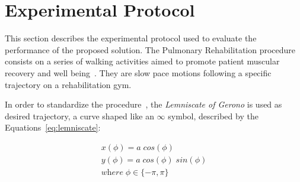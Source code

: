 \documentclass[journal]{IEEEtran}
\begin{document}




\section{Experimental Protocol} \label{experimental}

This section describes the experimental protocol used to evaluate the performance of the proposed solution.  The Pulmonary Rehabilitation procedure consists on a series of walking activities aimed to promote patient muscular recovery and well being~\cite{Wu2012}. They are slow pace motions following a specific trajectory on a rehabilitation gym.

In order to standardize the procedure~\cite{Sprunk2016}, the \textit{Lemniscate of Gerono} is used as desired trajectory, a curve shaped like an $\infty$ symbol, described by the Equations~\ref{eq:lemniscate}:

\begin{equation}
\begin{array}{ll}  
 x( \phi ) = a \; cos( \phi )     \\
 y( \phi ) = a \; cos ( \phi )   \; sin ( \phi )    \\ 
 \textit{where}  \; \phi \in \lbrace -\pi , \pi  \rbrace
\end{array}
\label{eq:lemniscate}
\end{equation}
\end{document}

